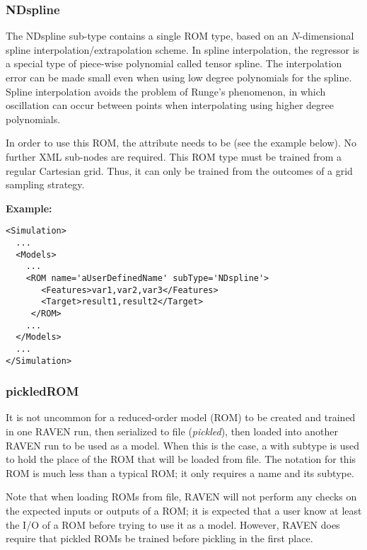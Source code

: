 %
\subsubsection{NDspline}
\label{subsubsec:NDspline}
The NDspline sub-type contains a single ROM type, based on an $N$-dimensional
spline interpolation/extrapolation scheme.
%
In spline interpolation, the regressor is a special type of piece-wise
polynomial called tensor spline.
%
The interpolation error can be made small even when using low degree polynomials
for the spline.
%
Spline interpolation avoids the problem of Runge's phenomenon, in which
oscillation can occur between points when interpolating using higher degree
polynomials.
%

In order to use this ROM, the  attribute  needs to
be  (see the example below).
%
No further XML sub-nodes are required.
%
\nb This ROM type must be trained from a regular Cartesian grid.
%
Thus, it can only be trained from the outcomes of a grid sampling strategy.


\textbf{Example:}
\begin{lstlisting}[style=XML,morekeywords={name,subType}]
<Simulation>
  ...
  <Models>
    ...
    <ROM name='aUserDefinedName' subType='NDspline'>
       <Features>var1,var2,var3</Features>
       <Target>result1,result2</Target>
     </ROM>
    ...
  </Models>
  ...
</Simulation>
\end{lstlisting}

\subsubsection{pickledROM}
\label{subsubsec:pickledROM}
It is not uncommon for a reduced-order model (ROM) to be created and trained in one RAVEN run, then
serialized to file (\emph{pickled}), then loaded into another RAVEN run to be used as a model.  When this is
the case, a  with subtype  is used to hold the place of the ROM that will
be loaded from file.  The notation for this ROM is much less than a typical ROM; it only requires a name and
its subtype.

Note that when loading ROMs from file, RAVEN will not perform any checks on the expected inputs or outputs of
a ROM; it is expected that a user know at least the I/O of a ROM before trying to use it as a model.
However, RAVEN does require that pickled ROMs be trained before pickling in the first place.

